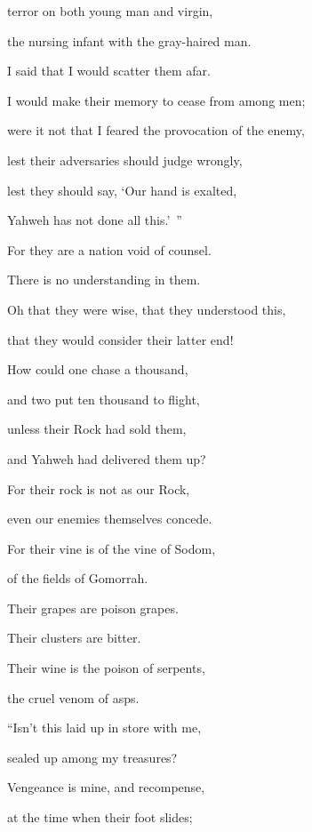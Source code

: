 {\par }{\QB terror on both young man and virgin,
\par }{\QB the nursing infant with the gray-haired man.
\par }{\Q {}I said that I would scatter them afar.
\par }{\QB I would make their memory to cease from among men;
\par }{\Q {}were it not that I feared the provocation of the enemy,
\par }{\QB lest their adversaries should judge wrongly,
\par }{\QB lest they should say, ‘Our hand is exalted,
\par }{\QB Yahweh has not done all this.’ ”
\par }{\BB \par }{\Q {}For they are a nation void of counsel.
\par }{\QB There is no understanding in them.
\par }{\Q {}Oh that they were wise, that they understood this,
\par }{\QB that they would consider their latter end!
\par }{\Q {}How could one chase a thousand,
\par }{\QB and two put ten thousand to flight,
\par }{\Q unless their Rock had sold them,
\par }{\QB and Yahweh had delivered them up?
\par }{\Q {}For their rock is not as our Rock,
\par }{\QB even our enemies themselves concede.
\par }{\Q {}For their vine is of the vine of Sodom,
\par }{\QB of the fields of Gomorrah.
\par }{\Q Their grapes are poison grapes.
\par }{\QB Their clusters are bitter.
\par }{\Q {}Their wine is the poison of serpents,
\par }{\QB the cruel venom of asps.
\par }{\BB \par }{\Q {}“Isn’t this laid up in store with me,
\par }{\QB sealed up among my treasures?
\par }{\Q {}Vengeance is mine, and recompense,
\par }{\QB at the time when their foot slides;
}
